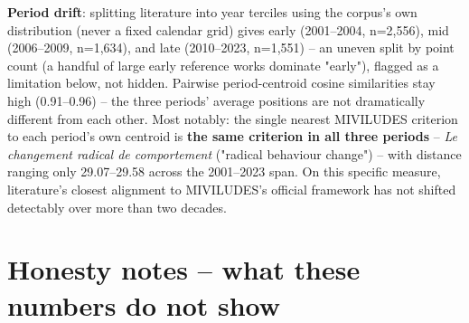 \documentclass[11pt,a4paper]{article}
\begin{document}
\textbf{Period drift}: splitting literature into year terciles using the
corpus's own distribution (never a fixed calendar grid) gives early
(2001--2004, n=2,556), mid (2006--2009, n=1,634), and late (2010--2023,
n=1,551) -- an uneven split by point count (a handful of large early
reference works dominate "early"), flagged as a limitation below, not
hidden. Pairwise period-centroid cosine similarities stay high (0.91--0.96)
-- the three periods' average positions are not dramatically different
from each other. Most notably: the single nearest MIVILUDES criterion to
each period's own centroid is \textbf{the same criterion in all three
periods} -- \emph{Le changement radical de comportement} ("radical
behaviour change") -- with distance ranging only 29.07--29.58 across the
2001--2023 span. On this specific measure, literature's closest
alignment to MIVILUDES's official framework has not shifted detectably
over more than two decades.

\section{Honesty notes -- what these numbers do not show}
\label{sec:honesty}
\end{document}
